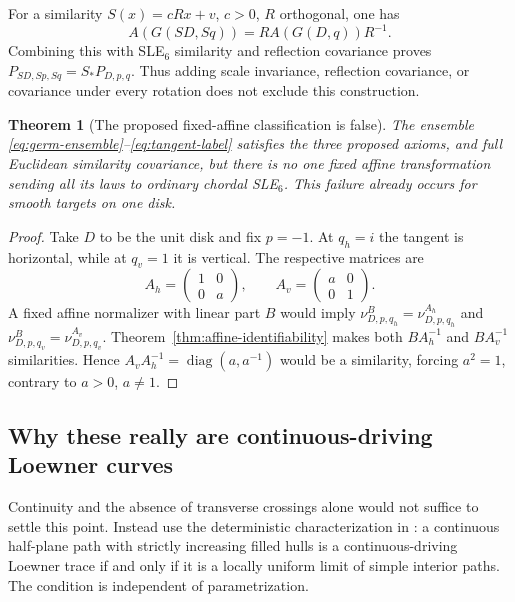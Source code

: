 \documentclass[11pt]{article}
\newtheorem{theorem}{Theorem}[section]
\theoremstyle{definition}\newtheorem{definition}[theorem]{Definition}
\theoremstyle{remark}\newtheorem{remark}[theorem]{Remark}
\newcommand{\nuA}[4]{\nu^{#1}_{#2,#3,#4}}
\begin{document}
For a similarity $S(x)=cRx+v$, $c>0$, $R$ orthogonal, one has
\[
 A(G(SD,Sq))=R A(G(D,q))R^{-1}.
\]
Combining this with SLE$_6$ similarity and reflection covariance proves
$P_{SD,Sp,Sq}=S_*P_{D,p,q}$. Thus adding scale invariance, reflection
covariance, or covariance under every rotation does not exclude this
construction.

\begin{theorem}[The proposed fixed-affine classification is false]
\label{thm:counterexample}
The ensemble \eqref{eq:germ-ensemble}--\eqref{eq:tangent-label} satisfies
the three proposed axioms, and full Euclidean similarity covariance, but
there is no one fixed affine transformation sending all its laws to
ordinary chordal SLE$_6$. This failure already occurs for smooth targets
on one disk.
\end{theorem}

\begin{proof}
Take $D$ to be the unit disk and fix $p=-1$. At $q_h=i$ the tangent is
horizontal, while at $q_v=1$ it is vertical. The respective matrices are
\[
 A_h=\begin{pmatrix}1&0\\0&a\end{pmatrix},\qquad
 A_v=\begin{pmatrix}a&0\\0&1\end{pmatrix}.
\]
A fixed affine normalizer with linear part $B$ would imply
$\nuA{B}{D}{p}{q_h}=\nuA{A_h}{D}{p}{q_h}$ and
$\nuA{B}{D}{p}{q_v}=\nuA{A_v}{D}{p}{q_v}$.
Theorem~\ref{thm:affine-identifiability} makes both $BA_h^{-1}$ and
$BA_v^{-1}$ similarities. Hence $A_vA_h^{-1}=\operatorname{diag}(a,a^{-1})$
would be a similarity, forcing $a^2=1$, contrary to $a>0$, $a\ne1$.
\end{proof}

\subsection{Why these really are continuous-driving Loewner curves}
\label{sec:loewner-admissible}

Continuity and the absence of transverse crossings alone would not suffice
to settle this point. Instead use the deterministic characterization in
\cite[Theorem 1.1 and Remark 1.4]{yuan}: a continuous half-plane path with
strictly increasing filled hulls is a continuous-driving Loewner trace if
and only if it is a locally uniform limit of simple interior paths. The
condition is independent of parametrization.
\end{document}
